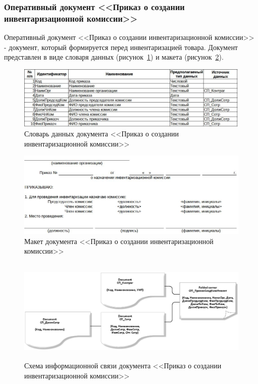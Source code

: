 \newpage
\subsubsection{Оперативный документ <<Приказ о создании инвентаризационной комиссии>>}

Оперативный документ <<Приказ о создании инвентаризационной комиссии>>
- документ, который формируется перед инвентаризацией товара.
Документ представлен в виде словаря данных (рисунок~\ref{fig:OP_PrikazSozdKomInvest_tipi})
и макета (рисунок~\ref{fig:OP_PrikazSozdKomInvest_maket}).

\begin{figure}[!h]
    \centering
    \includegraphics[width=14cm]
        {_docs/ОП_ПриказСоздКомИнвент_типы.jpg}
    \caption{Словарь данных документа <<Приказ о создании инвентаризационной комиссии>>}
    \label{fig:OP_PrikazSozdKomInvest_tipi}
\end{figure}

\begin{figure}[!h]
    \centering
    \includegraphics[width=14cm]
        {_docs/ОП_ПриказСоздКомИнвент_макет.jpg}
    \caption{Макет документа <<Приказ о создании инвентаризационной комиссии>>}
    \label{fig:OP_PrikazSozdKomInvest_maket}
\end{figure}

\begin{figure}[!h]
    \centering
    \includegraphics[height=5cm]
        {_docs/ОП_ПриказСоздКомИнвент_связи.png}
    \caption{Схема информационной связи документа <<Приказ о создании инвентаризационной комиссии>>}
    \label{fig:OP_PrikazSozdKomInvest_svazi}
\end{figure}

